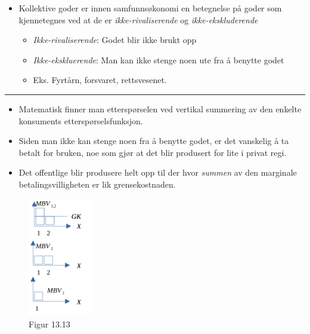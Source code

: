 \documentclass[
  letterpaper,
  DIV=11,
  numbers=noendperiod]{scrartcl}
\providecommand{\tightlist}{%
  \setlength{\itemsep}{0pt}\setlength{\parskip}{0pt}}\usepackage{longtable,booktabs,array}
\begin{document}
\begin{itemize}
\tightlist
\item
  Kollektive goder er innen samfunnsøkonomi en betegnelse på goder som
  kjennetegnes ved at de er \emph{ikke-rivaliserende} og
  \emph{ikke-ekskluderende}

  \begin{itemize}
  \tightlist
  \item
    \emph{Ikke-rivaliserende}: Godet blir ikke brukt opp
  \item
    \emph{Ikke-ekskluerende}: Man kan ikke stenge noen ute fra å benytte
    godet
  \item
    Eks. Fyrtårn, forsvaret, rettsvesenet.
  \end{itemize}
\end{itemize}

\begin{center}\rule{0.5\linewidth}{0.5pt}\end{center}

\begin{itemize}
\tightlist
\item
  Matematisk finner man etterspørselen ved vertikal summering av den
  enkelte konsuments etterspørselsfunksjon.
\item
  Siden man ikke kan stenge noen fra å benytte godet, er det vanskelig å
  ta betalt for bruken, noe som gjør at det blir produsert for lite i
  privat regi.
\item
  Det offentlige blir produsere helt opp til der hvor \emph{summen} av
  den marginale betalingsvilligheten er lik grensekostnaden.
\end{itemize}

\begin{figure}[H]

{\centering \includegraphics[width=0.25\textwidth,height=\textheight]{drawio/eks_mbv.png}

}

\caption{Figur 13.13}

\end{figure}%
\end{document}
